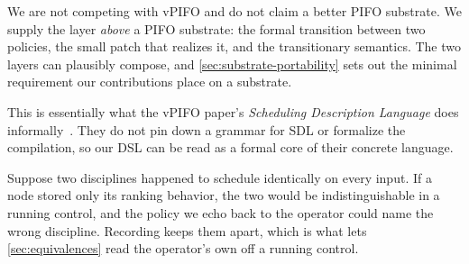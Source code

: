 We are not competing with vPIFO and do not claim a better PIFO substrate.
We supply the layer \emph{above} a PIFO substrate: the formal transition between two policies, the small patch that realizes it, and the transitionary semantics.
The two layers can plausibly compose, and \cref{sec:substrate-portability} sets out the minimal requirement our contributions place on a substrate.



This is essentially what the vPIFO paper's \emph{Scheduling Description Language} does informally~\cite{vPIFO}.
They do not pin down a grammar for SDL or formalize the compilation, so our DSL can be read as a formal core of their concrete language.



Suppose two disciplines happened to schedule identically on every input.
If a node stored only its ranking behavior, the two would be indistinguishable in a running control, and the policy we echo back to the operator could name the wrong discipline.
Recording \disc keeps them apart, which is what lets \cref{sec:equivalences} read the operator's own \disc off a running control.


